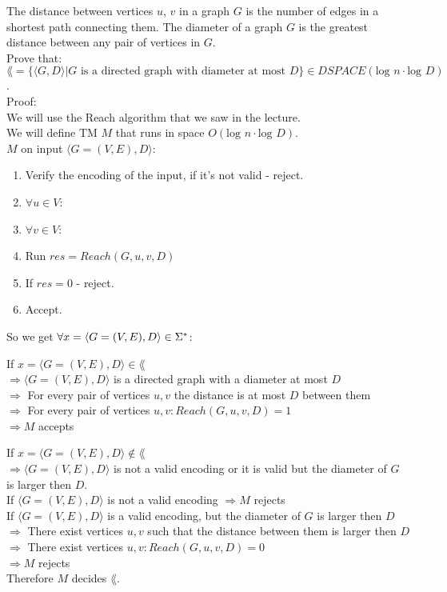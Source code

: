 The distance between vertices $u$, $v$ in a graph $G$ is the number of edges in a
shortest path connecting them. The diameter of a graph $G$ is the greatest
distance between any pair of vertices in $G$. \\
Prove that: \\
$\lang = \{\langle G, D \rangle | G \text{ is a directed graph with diameter at most } D \}
    \in DSPACE(\text{log }n \cdot \text{log }D)$. \\
Proof: \\
We will use the Reach algorithm that we saw in the lecture. \\
We will define TM $M$ that runs in space $O(\text{log }n \cdot \text{log }D)$. \\
$M$ on input $\langle G = (V,E), D \rangle$:

\begin{enumerate}[1., itemsep=5pt]
    \item Verify the encoding of the input, if it's not valid - reject.

    \item $\forall u \in V$:
    \item \qquad $\forall v \in V$:
    \item \qquad \qquad Run $res = Reach(G, u, v, D)$
    \item \qquad \qquad If $res = 0$ - reject.
    \item Accept.

\end{enumerate}

So we get $\forall x=\langle G = (V,E), D \rangle \in \Sigma^*$:

If $x=\langle G = (V,E), D \rangle \in \lang$ \\
$\Longrightarrow \langle G = (V,E), D \rangle$ is a directed graph with a diameter at most $D$  \\
$\Longrightarrow$ For every pair of vertices $u, v$ the distance is at most $D$ between them  \\
$\Longrightarrow$ For every pair of vertices $u, v: Reach(G, u, v, D) = 1$  \\
$\Longrightarrow M$ accepts

If $x=\langle G = (V,E), D \rangle \notin \lang$ \\
$\Longrightarrow \langle G = (V,E), D \rangle$ is not a valid encoding or it is valid but the diameter of $G$ is larger then $D$. \\
If $\langle G = (V,E), D \rangle$ is not a valid encoding $\Longrightarrow M$ rejects \\
If $\langle G = (V,E), D \rangle$ is a valid encoding, but the diameter of $G$ is larger then $D$ \\
$\Longrightarrow $ There exist vertices $u, v$ such that the distance between them is larger then $D$ \\
$\Longrightarrow $ There exist vertices $u, v: Reach(G, u, v, D) = 0$ \\
$\Longrightarrow M$ rejects \\
Therefore $M$ decides $\lang$. \\

